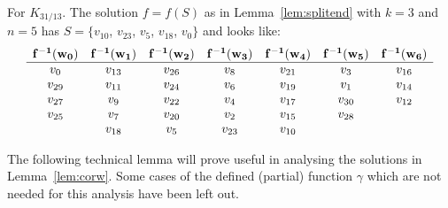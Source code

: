 \documentclass[11pt,a4paper]{article}
\begin{document}
\begin{exmp}
For $K_{31/13}$. The solution $f=f(S)$ as in Lemma~\ref{lem:splitend} with $k=3$ and $n=5$ has $S = \{v_{10}$, $v_{23}$, $v_{5}$, $v_{18}$, $v_{0}\}$ and looks like:
\[
\begin{array}{c c c c c c c}
{\bf f^{-1}(w_0)} & {\bf f^{-1}(w_1)} & {\bf f^{-1}(w_2)} & {\bf f^{-1}(w_3)} & {\bf f^{-1}(w_4)} & {\bf f^{-1}(w_5)} & {\bf f^{-1}(w_6)} \\ \hline
v_0 & v_{13} & v_{26} & v_8 & v_{21} & v_3 & v_{16} \\
v_{29} & v_{11} & v_{24} & v_6 & v_{19} & v_1 & v_{14} \\
v_{27} & v_{9} & v_{22} & v_4 & v_{17} & v_{30} & v_{12} \\
v_{25} & v_{7} & v_{20} & v_2 & v_{15} & v_{28} &  \\
& v_{18} & v_5 & v_{23} & v_{10} & &
\end{array}
\]
\end{exmp}

The following technical lemma will prove useful in analysing the solutions
in Lemma~\ref{lem:corw}.
Some cases of the defined (partial) function $\gamma$ which are not needed 
for this analysis have been left out.
\end{document}
